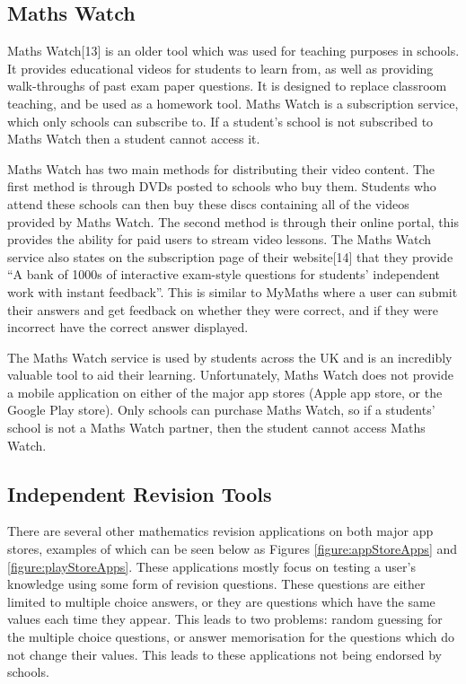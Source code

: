 \documentclass{article}
\begin{document}
\subsection{Maths Watch}

Maths Watch[13] is an older tool which was used for teaching purposes in schools. It provides educational videos for students to learn from, as well as providing walk-throughs of past exam paper questions. It is designed to replace classroom teaching, and be used as a homework tool. Maths Watch is a subscription service, which only schools can subscribe to. If a student's school is not subscribed to Maths Watch then a student cannot access it. \par

Maths Watch has two main methods for distributing their video content. The first method is through DVDs posted to schools who buy them. Students who attend these schools can then buy these discs containing all of the videos provided by Maths Watch. The second method is through their online portal, this provides the ability for paid users to stream video lessons. The Maths Watch service also states on the subscription page of their website[14] that they provide ``A bank of 1000s of interactive exam-style questions for students' independent work with instant feedback''. This is similar to MyMaths where a user can submit their answers and get feedback on whether they were correct, and if they were incorrect have the correct answer displayed. \par

The Maths Watch service is used by students across the UK and is an incredibly valuable tool to aid their learning. Unfortunately, Maths Watch does not provide a mobile application on either of the major app stores (Apple app store, or the Google Play store). Only schools can purchase Maths Watch, so if a students' school is not a Maths Watch partner, then the student cannot access Maths Watch. \par

\subsection{Independent Revision Tools}

There are several other mathematics revision applications on both major app stores, examples of which can be seen below as Figures \ref{figure:appStoreApps} and \ref{figure:playStoreApps}. These applications mostly focus on testing a user's knowledge using some form of revision questions. These questions are either limited to multiple choice answers, or they are questions which have the same values each time they appear. This leads to two problems: random guessing for the multiple choice questions, or answer memorisation for the questions which do not change their values. This leads to these applications not being endorsed by schools. \par
\end{document}
